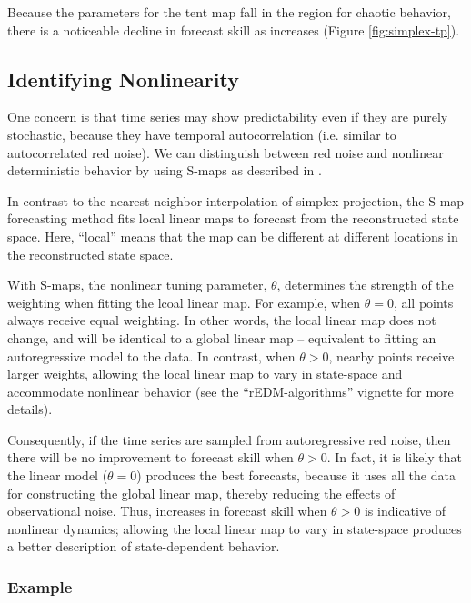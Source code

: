 \documentclass[article]{jss}
\begin{document}
Because the parameters for the tent map fall in the region for chaotic behavior, there is a noticeable decline in forecast skill as  increases (Figure \ref{fig:simplex-tp}).

\subsection{Identifying Nonlinearity}\label{sec:nonlinearity}

One concern is that time series may show predictability even if they are purely stochastic, because they have temporal autocorrelation (i.e. similar to autocorrelated red noise). We can distinguish between red noise and nonlinear deterministic behavior by using S-maps as described in \citet{Sugihara_1994}.

In contrast to the nearest-neighbor interpolation of simplex projection, the S-map forecasting method \citep{Sugihara_1994} fits local linear maps to forecast from the reconstructed state space. Here, ``local'' means that the map can be different at different locations in the reconstructed state space.

With S-maps, the nonlinear tuning parameter, $\theta$, determines the strength of the weighting when fitting the lcoal linear map. For example, when $\theta = 0$, all points always receive equal weighting. In other words, the local linear map does not change, and will be identical to a global linear map -- equivalent to fitting an autoregressive model to the data. In contrast, when $\theta > 0$, nearby points receive larger weights, allowing the local linear map to vary in state-space and accommodate nonlinear behavior (see the ``rEDM-algorithms'' vignette for more details).

Consequently, if the time series are sampled from autoregressive red noise, then there will be no improvement to forecast skill when $\theta > 0$. In fact, it is likely that the linear model ($\theta = 0$) produces the best forecasts, because it uses all the data for constructing the global linear map, thereby reducing the effects of observational noise. Thus, increases in forecast skill when $\theta > 0$ is indicative of nonlinear dynamics; allowing the local linear map to vary in state-space produces a better description of state-dependent behavior.

\subsubsection{Example}\label{nonlinearity-example}
\end{document}
